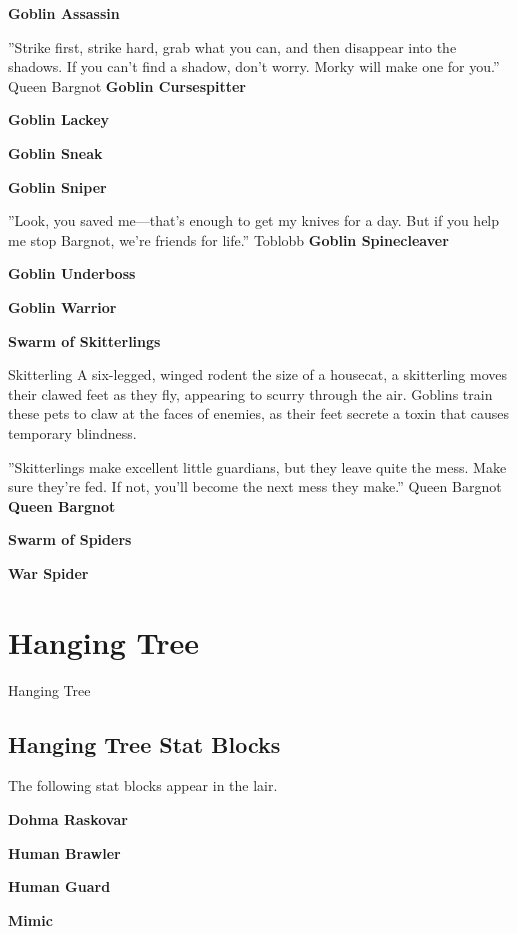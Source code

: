 \documentclass[10pt,a4paper,twoside,bg=print,twocolumn,openany,nodeprecatedcode]{dndbook}
\begin{document}
\textbf{Goblin Assassin}

\DndQuote%
{}
{''Strike first, strike hard, grab what you can, and then disappear into the shadows. If you can't find a shadow, don't worry. Morky will make one for you.''}
{Queen Bargnot}
\textbf{Goblin Cursespitter}

\textbf{Goblin Lackey}

\textbf{Goblin Sneak}

\textbf{Goblin Sniper}

\DndQuote%
{}
{''Look, you saved me—that's enough to get my knives for a day. But if you help me stop Bargnot, we're friends for life.''}
{Toblobb}
\textbf{Goblin Spinecleaver}

\textbf{Goblin Underboss}

\textbf{Goblin Warrior}

\textbf{Swarm of Skitterlings}

\begin{DndSidebar}[float=!b]{Skitterling}
A six-legged, winged rodent the size of a housecat, a skitterling moves their clawed feet as they fly, appearing to scurry through the air. Goblins train these pets to claw at the faces of enemies, as their feet secrete a toxin that causes temporary blindness.



\end{DndSidebar}

\DndQuote%
{}
{''Skitterlings make excellent little guardians, but they leave quite the mess. Make sure they're fed. If not, you'll become the next mess they make.''}
{Queen Bargnot}
\textbf{Queen Bargnot}

\textbf{Swarm of Spiders}

\textbf{War Spider}

\chapter{Hanging Tree}
Hanging Tree

\section{Hanging Tree Stat Blocks}
The following stat blocks appear in the lair.

\textbf{Dohma Raskovar}

\textbf{Human Brawler}

\textbf{Human Guard}

\textbf{Mimic}
\end{document}
